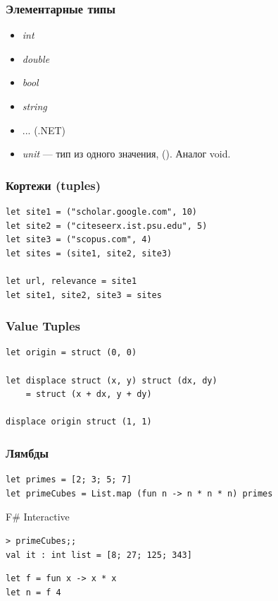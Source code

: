 \documentclass[xetex,mathserif,serif]{beamer}
\begin{document}
    \begin{frame}
        \frametitle{Элементарные типы}
        \begin{itemize}
            \item \textit{int}
            \item \textit{double}
            \item \textit{bool}
            \item \textit{string}
            \item ... (.NET)
            \item \textit{unit} --- тип из одного значения, (). Аналог void.
        \end{itemize}
    \end{frame}
    
    \begin{frame}[fragile]
        \frametitle{Кортежи (tuples)}
        \begin{verbatim}
let site1 = ("scholar.google.com", 10)
let site2 = ("citeseerx.ist.psu.edu", 5)
let site3 = ("scopus.com", 4)
let sites = (site1, site2, site3)

let url, relevance = site1
let site1, site2, site3 = sites
        \end{verbatim}
    \end{frame}

    \begin{frame}[fragile]
        \frametitle{Value Tuples}
        \begin{verbatim}
let origin = struct (0, 0)

let displace struct (x, y) struct (dx, dy)
    = struct (x + dx, y + dy)

displace origin struct (1, 1)
        \end{verbatim}
    \end{frame}

    \begin{frame}[fragile]
        \frametitle{Лямбды}
        \begin{verbatim}
let primes = [2; 3; 5; 7]
let primeCubes = List.map (fun n -> n * n * n) primes
        \end{verbatim}
        \begin{alertblock}{F\# Interactive}
            \begin{verbatim}
> primeCubes;;
val it : int list = [8; 27; 125; 343]
            \end{verbatim}
        \end{alertblock}
        \begin{verbatim}
let f = fun x -> x * x
let n = f 4
        \end{verbatim}
    \end{frame}
\end{document}

